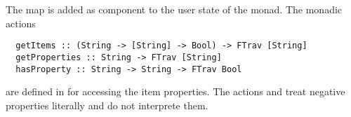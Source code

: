 The  map is added as component to the user state of the  monad. The monadic actions
\begin{verbatim}
  getItems :: (String -> [String] -> Bool) -> FTrav [String]
  getProperties :: String -> FTrav [String]
  hasProperty :: String -> String -> FTrav Bool
\end{verbatim}
are defined in  for accessing the item properties. The actions  and 
 treat negative properties literally and do not interprete them.
